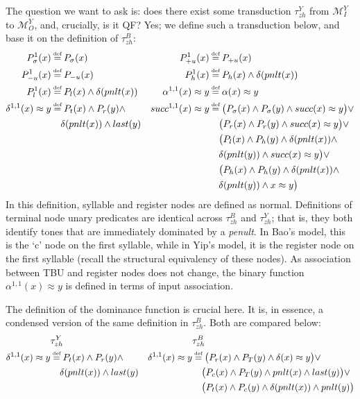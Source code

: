 \documentclass{article}
\newcommand\myeq{\mathrel{\stackrel{\makebox[0pt]{\mbox{\normalfont\tiny def}}}{=}}}
\newcommand{\ap}{\approx}
\begin{document}
The question we want to ask is: does there exist some transduction $\tau^{Y}_{zh}$ from $\mathcal{M}^{Y}_{I}$ to $\mathcal{M}^{Y}_{O}$, and, crucially, is it QF? Yes; we define such a transduction below, and base it on the definition of $\tau^{B}_{zh}$:
\begin{equation}
\begin{aligned}
P^1_{\sigma}(x)&\myeq P_{\sigma}(x) & P^1_{+u}(x)&\myeq P_{+u}(x) \\
P^1_{-u}(x)&\myeq P_{-u}(x) & P^1_{h}(x)&\myeq P_{h}(x)\land \delta(pnlt(x)) \\
P^1_{l}(x)&\myeq P_{l}(x)\land \delta(pnlt(x)) & \alpha^{1,1}(x)\ap y&\myeq \alpha(x)\ap y \\
\delta^{1,1}(x)\ap y&\myeq P_{t}(x)\land P_{r}(y)\land & succ^{1,1}(x)\ap y&\myeq \big(P_{\sigma}(x)\land P_{\sigma}(y)\land succ(x)\ap y\big)\lor \\
&\quad \delta(pnlt(x))\land last(y) & &\quad \big(P_{r}(x)\land P_{r}(y)\land succ(x)\ap y \big)\lor \\
& & &\quad \big(P_{l}(x)\land P_{h}(y)\land \delta(pnlt(x))\land\\
& & &\quad \delta(pnlt(y)) \land succ(x)\ap y\big) \lor \\
& & &\quad \big(P_{h}(x)\land P_{h}(y)\land \delta(pnlt(x))\land \\
& & &\quad \delta(pnlt(y))\land x\ap y\big) \\
\end{aligned}
\end{equation}
In this definition, syllable and register nodes are defined as normal. Definitions of terminal node unary predicates are identical across $\tau^{B}_{zh}$ and $\tau^{Y}_{zh}$; that is, they both identify tones that are immediately dominated by a \emph{penult}. In Bao's model, this is the `c' node on the first syllable, while in Yip's model, it is the register node on the first syllable (recall the structural equivalency of these nodes). As association between TBU and register nodes does not change, the binary function $\alpha^{1,1}(x)\ap y$ is defined in terms of input association. \par
The definition of the dominance function is crucial here. It is, in essence, a condensed version of the same definition in $\tau^{B}_{zh}$. Both are compared below:
\begin{equation}
\begin{aligned}
&\tau^{Y}_{zh} & &\tau^{B}_{zh} \\
\delta^{1,1}(x)\ap y&\myeq P_{t}(x)\land P_{r}(y)\land & \delta^{1,1}(x)\ap y &\myeq \big(P_{r}(x)\land P_{T}(y)\land \delta(x)\ap y\big)\lor \\
&\quad \delta(pnlt(x))\land last(y) & &\quad \big(P_{c}(x)\land P_{T}(y)\land pnlt(x)\land last(y)\big)\lor \\
& & &\quad \big(P_{t}(x)\land P_{c}(y)\land \delta(pnlt(x))\land pnlt(y)\big)\\
\end{aligned}
\end{equation}
\end{document}
